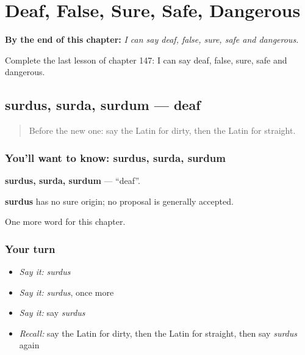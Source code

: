 
\chapter{Deaf, False, Sure, Safe, Dangerous}
\label{ch:la-deaf-false-sure-safe-dangerous}

\begin{chapteropening}
\textbf{By the end of this chapter:} \emph{I can say deaf, false, sure, safe and dangerous.}

Complete the last lesson of chapter 147: I can say deaf, false, sure, safe and dangerous.
\end{chapteropening}

\section[surdus, surda, surdum]{surdus, surda, surdum — deaf}

\label{lesson:LA-C147-surdus}



\begin{quote}
Before the new one: say the Latin for dirty, then the Latin for straight.
\end{quote}

\subsection*{You'll want to know: surdus, surda, surdum}
\textbf{surdus, surda, surdum} — \textquotedblleft{}deaf\textquotedblright{}.

\begin{cousinweb}
\textbf{surdus} has no sure origin; no proposal is generally accepted.
\end{cousinweb}

\begin{grammarlens}[title={What you've built}]
One more word for this chapter.
\end{grammarlens}

\subsection*{Your turn}
\begin{itemize}
\raggedright
  \item \emph{Say it:} \emph{surdus}
  \item \emph{Say it:} \emph{surdus}, once more
  \item \emph{Say it:} say \emph{surdus}
  \item \emph{Recall:} say the Latin for dirty, then the Latin for straight, then say \emph{surdus} again
\end{itemize}

